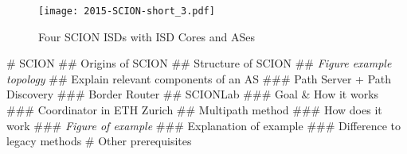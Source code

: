 \documentclass[thesis.tex]{subfiles}
\begin{document}
\begin{figure}
	\centering
	\texttt{[image: 2015-SCION-short\_3.pdf]}
	\caption{Four SCION ISDs with ISD Cores and ASes \cite{SCIONPaper}}
	\label{fig:prequirement:scionStructure}
\end{figure}

\begin{easylist}
    \MyListProperties
    # SCION
    ## Origins of SCION
    ## Structure of SCION
    ## \textit{Figure example topology}
    ## Explain relevant components of an AS
    ### Path Server + Path Discovery
    ### Border Router
    ## SCIONLab
    ### Goal \& How it works
    ### Coordinator in ETH Zurich
    ## Multipath method
    ### How does it work
    ### \textit{Figure of example}
    ### Explanation of example
    ### Difference to legacy methods
    # Other prerequisites
\end{easylist}

\subfilebib %
\end{document}
